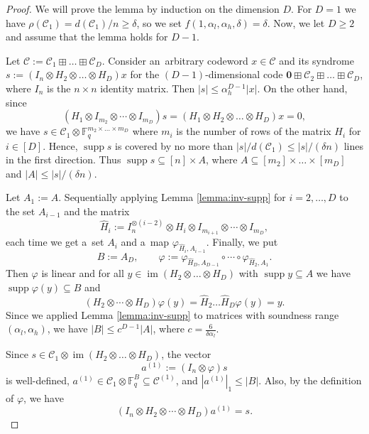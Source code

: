 \documentclass[conference]{IEEEtran}
\let\le\leqslant
\let\ge\geqslant
\let\phi\varphi
\theoremstyle{plain}
\theoremstyle{definition}
\theoremstyle{remark}
\newcommand{\cC}{\mathcal{C}}
\newcommand{\F}{\mathbb{F}}
\DeclareMathOperator{\im}{im}
\DeclareMathOperator{\supp}{supp}
\begin{document}
\begin{proof}
We will prove the lemma by induction on the dimension $D$. For $D=1$ we have $\rho(\cC_1)=d(\cC_1)/n \ge \delta$, so we set $f(1,\alpha_l,\alpha_h,\delta)=\delta$. Now, we let $D\ge 2$ and assume that the lemma holds for $D-1$.

Let $\cC:=\cC_1\boxplus \dots\boxplus \cC_D$. 
Consider an~arbitrary codeword $x\in \cC$ and its syndrome $s:=(I_n\otimes H_2\otimes \dots\otimes H_D) x$ for the $(D-1)$-dimensional code $\mathbf{0}\boxplus \cC_2\boxplus\dots\boxplus \cC_D$, where $I_n$ is the $n\times n$ identity matrix. 
Then $|s|\le \alpha_h^{D-1}|x|$. 
On the other hand, since
\[(H_1\otimes I_{m_2}\otimes \cdots \otimes I_{m_D})s=(H_1\otimes H_2\otimes \dots\otimes H_D) x=0,\]
we have $s\in \cC_1\otimes \F_q^{m_2\times \dots\times m_D}$ where $m_i$ is the number of rows of the matrix $H_i$ for $i\in [D]$. 
Hence, $\supp s$ is covered by no more than $|s|/d(\cC_1)\le|s|/(\delta n)$ lines in the first direction. Thus $\supp s\subseteq [n]\times A$, where $A\subseteq [m_2]\times \dots\times [m_D]$ and $|A|\le |s|/(\delta n)$.

Let $A_1:=A$. 
Sequentially applying Lemma \ref{lemma:inv-supp} for $i=2,\dots,D$ to the set $A_{i-1}$ and the matrix 
\[
    \hat H_{i}:=I_n^{\otimes (i-2)}\otimes H_{i}\otimes I_{m_{i+1}}\otimes \cdots\otimes I_{m_D},
\] 
each time we get a~set $A_{i}$ and a~map $\phi_{\hat H_i, A_{i-1}}$. 
Finally, we put \[
    B:=A_D,\qquad \phi:=\phi_{\hat H_D,A_{D-1}}\circ \cdots\circ\phi_{\hat H_2, A_1}.
\] 
Then $\phi$ is linear and for all $y\in \im (H_2\otimes \dots \otimes H_D)$ with $\supp y\subseteq A$ we have $\supp \phi(y)\subseteq B$ and \[
    (H_2\otimes \cdots\otimes H_D) \phi(y)=\hat{H}_2\ldots \hat H_D \phi(y)=y.
\] 
Since we applied Lemma \ref{lemma:inv-supp} to matrices with soundness range $(\alpha_l,\alpha_h)$, we have $|B|\le c^{D-1}|A|$, where $c=\frac{6}{\delta \alpha_l}$.

Since $s\in \cC_1\otimes \im (H_2\otimes \dots \otimes H_D)$, the vector \[a^{(1)}:=(I_n\otimes \phi)s\] is well-defined, $a^{(1)}\in \cC_1\otimes \F_q^B\subseteq \cC^{(1)}$, and $|a^{(1)}|_1\le |B|$. Also, by the definition of $\phi$, we have \[(I_n\otimes H_2\otimes\cdots\otimes H_D)a^{(1)}=s.\]


\end{proof}
\end{document}
